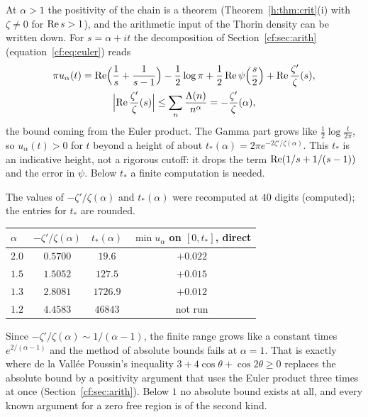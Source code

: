 At $\alpha>1$ the positivity of the chain is a theorem (Theorem~\ref{h:thm:crit}(i) with $\zeta\ne0$ for $\operatorname{Re} s>1$), and the arithmetic input of the Thorin density can be written down. For $s=\alpha+it$ the decomposition of Section~\ref{cf:sec:arith} (equation~\eqref{cf:eq:euler}) reads
\begin{multline*}
\pi u_\alpha(t)=\operatorname{Re}\Bigl(\frac1s+\frac1{s-1}\Bigr)-\frac12\log\pi+\frac12\operatorname{Re}\psi\Bigl(\frac s2\Bigr)+\operatorname{Re}\frac{\zeta'}{\zeta}(s),\\ \Bigl|\operatorname{Re}\frac{\zeta'}{\zeta}(s)\Bigr|\le\sum_n\frac{\Lambda(n)}{n^\alpha}=-\frac{\zeta'}{\zeta}(\alpha),
\end{multline*}
the bound coming from the Euler product. The Gamma part grows like $\frac12\log\frac{t}{2\pi}$, so $u_\alpha(t)>0$ for $t$ beyond a height of about $t_*(\alpha)=2\pi e^{-2\zeta'/\zeta(\alpha)}$. This $t_*$ is an indicative height, not a rigorous cutoff: it drops the term $\operatorname{Re}(1/s+1/(s-1))$ and the error in $\psi$. Below $t_*$ a finite computation is needed.

\begin{computation}\label{h:comp:euler}
The values of $-\zeta'/\zeta(\alpha)$ and $t_*(\alpha)$ were recomputed at $40$ digits (computed); the entries for $t_*$ are rounded.
\begin{center}\small
\begin{tabular}{@{}lccc@{}}
\toprule
$\alpha$ & $-\zeta'/\zeta(\alpha)$ & $t_*(\alpha)$ & $\min u_\alpha$ on $[0,t_*]$, direct\\
\midrule
$2.0$ & $0.5700$ & $19.6$ & $+0.022$\\
$1.5$ & $1.5052$ & $127.5$ & $+0.015$\\
$1.3$ & $2.8081$ & $1726.9$ & $+0.012$\\
$1.2$ & $4.4583$ & $46843$ & not run\\
\bottomrule
\end{tabular}
\end{center}
\end{computation}

Since $-\zeta'/\zeta(\alpha)\sim1/(\alpha-1)$, the finite range grows like a constant times $e^{2/(\alpha-1)}$ and the method of absolute bounds fails at $\alpha=1$. That is exactly where de la Vall\'ee Poussin's inequality $3+4\cos\theta+\cos2\theta\ge0$ replaces the absolute bound by a positivity argument that uses the Euler product three times at once (Section~\ref{cf:sec:arith}). Below $1$ no absolute bound exists at all, and every known argument for a zero free region is of the second kind.
